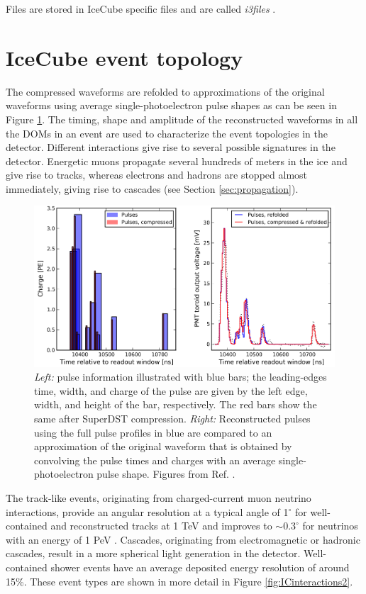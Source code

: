 \noindent Files are stored in IceCube specific files and are called \textit{i3files} .

\section{IceCube event topology}
The compressed waveforms are refolded to approximations of the original waveforms using average single-photoelectron pulse shapes as can be seen in Figure \ref{fig:waveform}. The timing, shape and amplitude of the reconstructed waveforms in all the DOMs in an event are used to characterize the event topologies in the detector. Different interactions give rise to several possible signatures in the detector. Energetic muons propagate several hundreds of meters in the ice and give rise to tracks, whereas electrons and hadrons are stopped almost immediately, giving rise to cascades (see Section \ref{sec:propagation}).

\begin{figure}[t]
\centering
\includegraphics[width=\textwidth]{chapter5/img/waveform.png}
\caption{\textit{Left:} pulse information illustrated with blue bars; the leading-edges time, width, and charge of the pulse are given by the left edge, width, and height of the bar, respectively. The red bars show the same after SuperDST compression. \textit{Right: }Reconstructed pulses using the full pulse profiles in blue are compared to an approximation of the original waveform that is obtained by convolving the pulse times and charges with an average single-photoelectron pulse shape. Figures from Ref. \cite{waveforms}.}
\label{fig:waveform}
\end{figure}

The track-like events, originating from charged-current muon neutrino interactions, provide an angular resolution at a typical angle of 1$^\circ$ for well-contained and reconstructed tracks at 1 TeV and improves to $\sim 0.3^\circ$ for neutrinos with an energy of 1 PeV \cite{Aartsen:2018ywr}. Cascades, originating from electromagnetic or hadronic cascades, result in a more spherical light generation in the detector. Well-contained shower events have an average deposited energy resolution of around 15\%. These event types are shown in more detail in Figure \ref{fig:ICinteractions2}.
 

